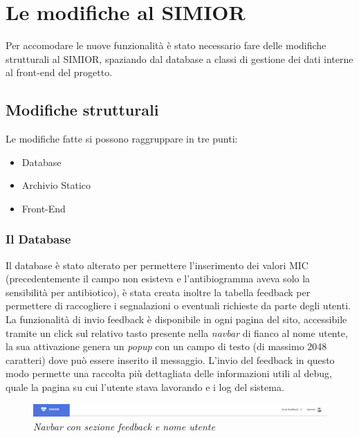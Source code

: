 \chapter{Le modifiche al SIMIOR}
Per accomodare le nuove funzionalità è stato necessario fare delle modifiche strutturali al SIMIOR, spaziando dal database a classi di gestione dei dati interne al front-end del progetto.
\section{Modifiche strutturali}\label{modifiche_strutturali}
Le modifiche fatte si possono raggruppare in tre punti:
\begin{itemize}
	\item Database
	\item Archivio Statico
	\item Front-End
\end{itemize}
\subsection{Il Database}
Il database è stato alterato per permettere l'inserimento dei valori MIC (precedentemente il campo non esisteva e l'antibiogramma aveva solo la sensibilità per antibiotico), è stata creata inoltre la tabella feedback per permettere di raccogliere i segnalazioni o eventuali richieste da parte degli utenti.
La funzionalità di invio feedback è disponibile in ogni pagina del sito, accessibile tramite un click sul relativo tasto presente nella \textit{navbar} di fianco al nome utente, la sua attivazione genera un \textit{popup} con un campo di testo (di massimo 2048 caratteri) dove può essere inserito il messaggio. L'invio del feedback in questo modo permette una raccolta più dettagliata delle informazioni utili al debug, quale la pagina su cui l'utente stava lavorando e i log del sistema.
\begin{figure}[h!]
	\centering
	\includegraphics[width=.99\columnwidth]{images/navbar}
	\caption{\textit{Navbar con sezione feedback e nome utente}}
	\label{fig:feature_location}
\end{figure}
\newline
